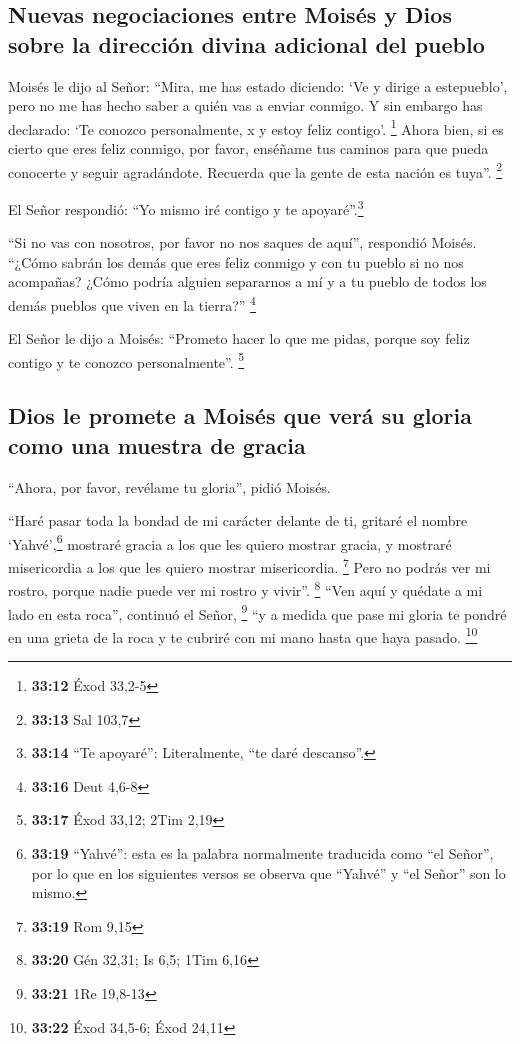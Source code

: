 \hypertarget{nuevas-negociaciones-entre-moisuxe9s-y-dios-sobre-la-direcciuxf3n-divina-adicional-del-pueblo}{%
\subsection{Nuevas negociaciones entre Moisés y Dios sobre la dirección
divina adicional del
pueblo}\label{nuevas-negociaciones-entre-moisuxe9s-y-dios-sobre-la-direcciuxf3n-divina-adicional-del-pueblo}}

 Moisés le dijo al Señor: ``Mira, me has estado diciendo:
`Ve y dirige a estepueblo', pero no me has hecho saber a quién vas a
enviar conmigo. Y sin embargo has declarado: `Te conozco personalmente,
x y estoy feliz contigo'. \footnote{\textbf{33:12} Éxod 33,2-5}
 Ahora bien, si es cierto que eres feliz conmigo, por
favor, enséñame tus caminos para que pueda conocerte y seguir
agradándote. Recuerda que la gente de esta nación es tuya''. \footnote{\textbf{33:13}
  Sal 103,7}

 El Señor respondió: ``Yo mismo iré contigo y te
apoyaré''.\footnote{\textbf{33:14} ``Te apoyaré'': Literalmente, ``te
  daré descanso''.}

 ``Si no vas con nosotros, por favor no nos saques de
aquí'', respondió Moisés.  ``¿Cómo sabrán los demás que
eres feliz conmigo y con tu pueblo si no nos acompañas? ¿Cómo podría
alguien separarnos a mí y a tu pueblo de todos los demás pueblos que
viven en la tierra?'' \footnote{\textbf{33:16} Deut 4,6-8}

 El Señor le dijo a Moisés: ``Prometo hacer lo que me
pidas, porque soy feliz contigo y te conozco personalmente''.
\footnote{\textbf{33:17} Éxod 33,12; 2Tim 2,19}

\hypertarget{dios-le-promete-a-moisuxe9s-que-veruxe1-su-gloria-como-una-muestra-de-gracia}{%
\subsection{Dios le promete a Moisés que verá su gloria como una muestra
de
gracia}\label{dios-le-promete-a-moisuxe9s-que-veruxe1-su-gloria-como-una-muestra-de-gracia}}

 ``Ahora, por favor, revélame tu gloria'', pidió Moisés.

 ``Haré pasar toda la bondad de mi carácter delante de
ti, gritaré el nombre `Yahvé',\footnote{\textbf{33:19} ``Yahvé'': esta
  es la palabra normalmente traducida como ``el Señor'', por lo que en
  los siguientes versos se observa que ``Yahvé'' y ``el Señor'' son lo
  mismo.} mostraré gracia a los que les quiero mostrar gracia, y
mostraré misericordia a los que les quiero mostrar misericordia.
\footnote{\textbf{33:19} Rom 9,15}  Pero no podrás ver mi
rostro, porque nadie puede ver mi rostro y vivir''. \footnote{\textbf{33:20}
  Gén 32,31; Is 6,5; 1Tim 6,16}  ``Ven aquí y quédate a
mi lado en esta roca'', continuó el Señor, \footnote{\textbf{33:21} 1Re
  19,8-13}  ``y a medida que pase mi gloria te pondré en
una grieta de la roca y te cubriré con mi mano hasta que haya pasado.
\footnote{\textbf{33:22} Éxod 34,5-6; Éxod 24,11}


